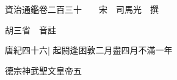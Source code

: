 






























































資治通鑑卷二百三十　　宋　司馬光　撰

胡三省　音註

唐紀四十六|{
	起閼逢困敦二月盡四月不滿一年}


德宗神武聖文皇帝五

